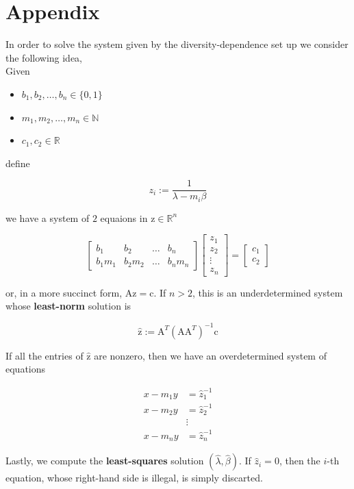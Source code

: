 \documentclass[]{article}
\begin{document}
\newpage
\section*{Appendix}


In order to solve the system given by the diversity-dependence set up we consider the following idea,\\

Given 

\begin{itemize}
	\item $b_1, b_2, \dots, b_n \in \{0,1\}$
	\item $m_1, m_2, \dots, m_n \in \mathbb N$
	\item $c_1, c_2 \in \mathbb R$
\end{itemize}


define  

$$ z_i := \dfrac{1}{\lambda - m_i \beta} $$

we have a system of $2$ equaions in $\mathrm z \in \mathbb R^n$

$$ \begin{bmatrix} b_1 & b_2 & \dots & b_n\\ b_1 m_1 & b_2 m_2 & \dots & b_n m_n\end{bmatrix} \begin{bmatrix} z_1\\ z_2\\ \vdots\\ z_n\end{bmatrix} = \begin{bmatrix} c_1\\ c_2\end{bmatrix}$$

or, in a more succinct form, $\mathrm A \mathrm z = \mathrm c$. If $n>2$, this is an underdetermined system whose {\bf least-norm} solution is 

$$\hat{\mathrm z} := \mathrm A^T (\mathrm A \mathrm A^T)^{-1} \mathrm c$$

If all the entries of $\hat{\mathrm z}$ are nonzero, then we have an overdetermined system of equations 

 $$ \begin{array}{rl} x - m_1 y &= \hat z_1^{-1}\\ x - m_2 y &= \hat z_2^{-1}\\ &\vdots \\ x - m_n y &= \hat z_n^{-1}\end{array} $$
 
 Lastly, we compute the {\bf least-squares} solution $(\hat \lambda, \hat \beta)$. If $\hat z_i = 0$, then the $i$-th equation, whose right-hand side is illegal, is simply discarted. 
\end{document}
